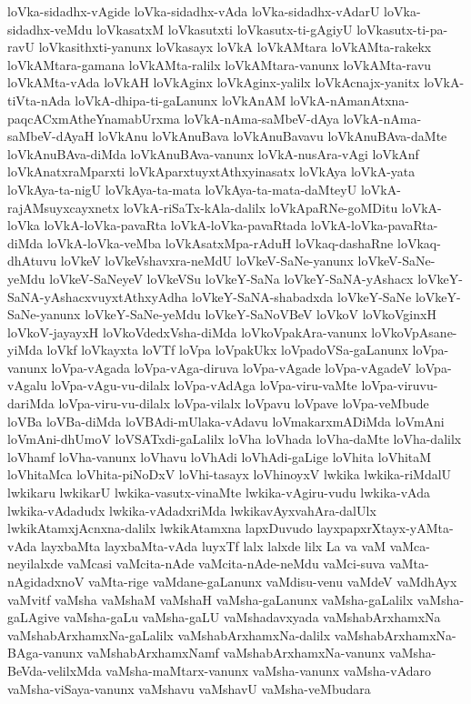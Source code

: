 {loVka-sidadhx-vAgide
loVka-sidadhx-vAda
loVka-sidadhx-vAdarU
loVka-sidadhx-veMdu
loVkasatxM
loVkasutxti
loVkasutx-ti-gAgiyU
loVkasutx-ti-pa-ravU
loVkasithxti-yanunx
loVkasayx
loVkA
loVkAMtara
loVkAMta-rakekx
loVkAMtara-gamana
loVkAMta-ralilx
loVkAMtara-vanunx
loVkAMta-ravu
loVkAMta-vAda
loVkAH
loVkAginx
loVkAginx-yalilx
loVkAcnajx-yanitx
loVkA-tiVta-nAda
loVkA-dhipa-ti-gaLanunx
loVkAnAM
loVkA-nAmanAtxna-paqcACxmAtheYnamabUrxma
loVkA-nAma-saMbeV-dAya
loVkA-nAma-saMbeV-dAyaH
loVkAnu
loVkAnuBava
loVkAnuBavavu
loVkAnuBAva-daMte
loVkAnuBAva-diMda
loVkAnuBAva-vanunx
loVkA-nusAra-vAgi
loVkAnf
loVkAnatxraMparxti
loVkAparxtuyxtAthxyinasatx
loVkAya
loVkA-yata
loVkAya-ta-nigU
loVkAya-ta-mata
loVkAya-ta-mata-daMteyU
loVkA-rajAMsuyxcayxnetx
loVkA-riSaTx-kAla-dalilx
loVkApaRNe-goMDitu
loVkA-loVka
loVkA-loVka-pavaRta
loVkA-loVka-pavaRtada
loVkA-loVka-pavaRta-diMda
loVkA-loVka-veMba
loVkAsatxMpa-rAduH
loVkaq-dashaRne
loVkaq-dhAtuvu
loVkeV
loVkeVshavxra-neMdU
loVkeV-SaNe-yanunx
loVkeV-SaNe-yeMdu
loVkeV-SaNeyeV
loVkeVSu
loVkeY-SaNa
loVkeY-SaNA-yAshacx
loVkeY-SaNA-yAshacxvuyxtAthxyAdha
loVkeY-SaNA-shabadxda
loVkeY-SaNe
loVkeY-SaNe-yanunx
loVkeY-SaNe-yeMdu
loVkeY-SaNoVBeV
loVkoV
loVkoVginxH
loVkoV-jayayxH
loVkoVdedxVsha-diMda
loVkoVpakAra-vanunx
loVkoVpAsane-yiMda
loVkf
loVkayxta
loVTf
loVpa
loVpakUkx
loVpadoVSa-gaLanunx
loVpa-vanunx
loVpa-vAgada
loVpa-vAga-diruva
loVpa-vAgade
loVpa-vAgadeV
loVpa-vAgalu
loVpa-vAgu-vu-dilalx
loVpa-vAdAga
loVpa-viru-vaMte
loVpa-viruvu-dariMda
loVpa-viru-vu-dilalx
loVpa-vilalx
loVpavu
loVpave
loVpa-veMbude
loVBa
loVBa-diMda
loVBAdi-mUlaka-vAdavu
loVmakarxmADiMda
loVmAni
loVmAni-dhUmoV
loVSATxdi-gaLalilx
loVha
loVhada
loVha-daMte
loVha-dalilx
loVhamf
loVha-vanunx
loVhavu
loVhAdi
loVhAdi-gaLige
loVhita
loVhitaM
loVhitaMca
loVhita-piNoDxV
loVhi-tasayx
loVhinoyxV
lwkika
lwkika-riMdalU
lwkikaru
lwkikarU
lwkika-vasutx-vinaMte
lwkika-vAgiru-vudu
lwkika-vAda
lwkika-vAdadudx
lwkika-vAdadxriMda
lwkikavAyxvahAra-dalUlx
lwkikAtamxjAcnxna-dalilx
lwkikAtamxna
lapxDuvudo
layxpapxrXtayx-yAMta-vAda
layxbaMta
layxbaMta-vAda
luyxTf
lalx
lalxde
lilx
La
va
vaM
vaMca-neyilalxde
vaMcasi
vaMcita-nAde
vaMcita-nAde-neMdu
vaMci-suva
vaMta-nAgidadxnoV
vaMta-rige
vaMdane-gaLanunx
vaMdisu-venu
vaMdeV
vaMdhAyx
vaMvitf
vaMsha
vaMshaM
vaMshaH
vaMsha-gaLanunx
vaMsha-gaLalilx
vaMsha-gaLAgive
vaMsha-gaLu
vaMsha-gaLU
vaMshadavxyada
vaMshabArxhamxNa
vaMshabArxhamxNa-gaLalilx
vaMshabArxhamxNa-dalilx
vaMshabArxhamxNa-BAga-vanunx
vaMshabArxhamxNamf
vaMshabArxhamxNa-vanunx
vaMsha-BeVda-velilxMda
vaMsha-maMtarx-vanunx
vaMsha-vanunx
vaMsha-vAdaro
vaMsha-viSaya-vanunx
vaMshavu
vaMshavU
vaMsha-veMbudara
}

